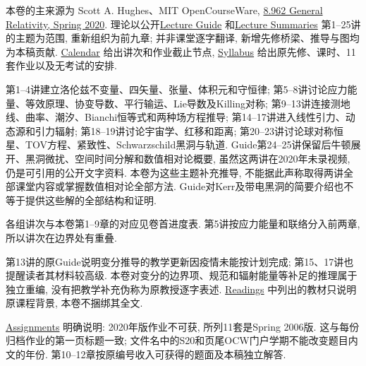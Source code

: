 \label{ch:sources}

本卷的主来源为 Scott A. Hughes、MIT OpenCourseWare,
\href{https://ocw.mit.edu/courses/8-962-general-relativity-spring-2020/}{8.962 General Relativity, Spring 2020}.
理论以公开\href{https://ocw.mit.edu/courses/8-962-general-relativity-spring-2020/resources/mit8_962s20_guide/}{Lecture Guide}
和\href{https://ocw.mit.edu/courses/8-962-general-relativity-spring-2020/pages/lecture-summaries/}{Lecture Summaries}
第1--25讲的主题为范围, 重新组织为前九章;
并非课堂逐字翻译, 新增先修桥梁、推导与图均为本稿贡献.
\href{https://ocw.mit.edu/courses/8-962-general-relativity-spring-2020/pages/calendar/}{Calendar}
给出讲次和作业截止节点,
\href{https://ocw.mit.edu/courses/8-962-general-relativity-spring-2020/pages/syllabus/}{Syllabus}
给出原先修、课时、11套作业以及无考试的安排.

第1--4讲建立洛伦兹不变量、四矢量、张量、体积元和守恒律;
第5--8讲讨论应力能量、等效原理、协变导数、平行输运、Lie导数及Killing对称;
第9--13讲连接测地线、曲率、潮汐、Bianchi恒等式和两种场方程推导;
第14--17讲进入线性引力、动态源和引力辐射;
第18--19讲讨论宇宙学、红移和距离;
第20--23讲讨论球对称恒星、TOV方程、紧致性、Schwarzschild黑洞与轨道.
Guide第24--25讲保留后牛顿展开、黑洞微扰、空间时间分解和数值相对论概要,
虽然这两讲在2020年未录视频, 仍是可引用的公开文字资料.
本卷为这些主题补充推导, 不能据此声称取得两讲全部课堂内容或掌握数值相对论全部方法.
Guide对Kerr及带电黑洞的简要介绍也不等于提供这些解的全部结构和证明.

各组讲次与本卷第1--9章的对应见卷首进度表.
第5讲按应力能量和联络分入前两章, 所以讲次在边界处有重叠.

第13讲的原Guide说明变分推导的教学更新因疫情未能按计划完成;
第15、17讲也提醒读者其材料较高级.
本卷对变分的边界项、规范和辐射能量等补足的推理属于独立重编,
没有把教学补充伪称为原教授逐字表述.
\href{https://ocw.mit.edu/courses/8-962-general-relativity-spring-2020/pages/readings/}{Readings}
中列出的教材只说明原课程背景, 本卷不捆绑其全文.

\href{https://ocw.mit.edu/courses/8-962-general-relativity-spring-2020/pages/assignments/}{Assignments}
明确说明: 2020年版作业不可获, 所列11套是Spring 2006版.
这与每份归档作业的第一页标题一致;
文件名中的S20和页尾OCW门户学期不能改变题目内文的年份.
第10--12章按原编号收入可获得的题面及本稿独立解答.

